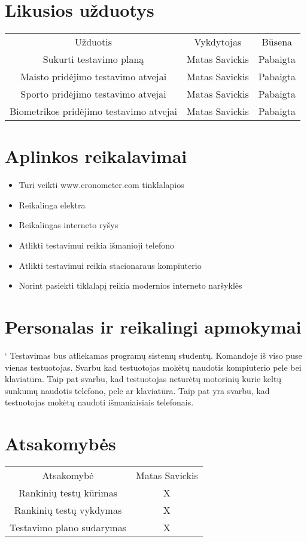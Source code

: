 \documentclass[oneside]{VUMIFPSkursinis}
\begin{document}
\section{Likusios užduotys}
\begin{center}
\begin{tabular}{ |c|c|c| } 
 \hline
 Užduotis & Vykdytojas & Būsena \\ 
 Sukurti testavimo planą & Matas Savickis & Pabaigta \\ 
 Maisto pridėjimo testavimo atvejai  & Matas Savickis & Pabaigta \\ 
 Sporto pridėjimo testavimo atvejai & Matas Savickis & Pabaigta \\
 Biometrikos pridėjimo testavimo atvejai & Matas Savickis & Pabaigta \\
 \hline
\end{tabular}
\end{center}

\section{Aplinkos reikalavimai}
	\begin{itemize}
		\item{Turi veikti www.cronometer.com tinklalapios}
		\item{Reikalinga elektra}
		\item{Reikalingas interneto ryšys}
		\item{Atlikti testavimui reikia išmanioji telefono}
		\item{Atlikti testavimui reikia stacionaraus kompiuterio}
		\item{Norint pasiekti tiklalapį reikia modernios interneto naršyklės}
	\end{itemize}

\section{Personalas ir reikalingi apmokymai}
`	Testavimas bus atliekamas programų sistemų studentų. Komandoje iš viso puse vienas testuotojas. Svarbu kad testuotojas mokėtų naudotis kompiuterio pele bei klaviatūra. Taip pat svarbu, kad testuotojas neturėtų motorinių kurie keltų sunkumų naudotis telefono, pele ar klaviatūra. Taip pat yra svarbu, kad testuotojas mokėtų naudoti išmaniaisiais telefonais.

\section{Atsakomybės}
\begin{center}
\begin{tabular}{ |c|c| } 
 \hline
 Atsakomybė & Matas Savickis \\
 Rankinių testų kūrimas & X \\
 Rankinių testų vykdymas & X \\
 Testavimo plano sudarymas & X \\
 \hline
\end{tabular}
\end{center}
\end{document}

